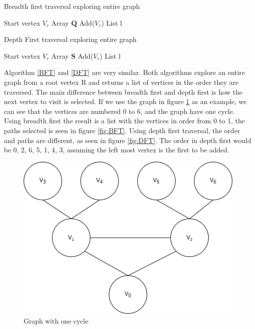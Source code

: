 \begin{algorithm}[H]
    \caption{Breadth first traversal exploring entire graph}
    \label{BFT}
    \SetAlgoLined
    Start vertex $V_r$\; Array $\mathbf{Q}$ Add($V_r$)\; List l\;
    \;
\end{algorithm}

\begin{algorithm}[H]
    \caption{Depth First traversal exploring entire graph}
    \label{DFT}
    \SetAlgoLined
    Start vertex $V_r$\; Array $\mathbf{S}$ Add($V_r$)\; List l\;
    \;
\end{algorithm}

Algorithm \ref{BFT} and \ref{DFT} are very similar. Both algorithms explore an entire graph from a root vertex R and returns a list of vertices in the order they are traversed. The main difference between breadth first and depth first is how the next vertex to visit is selected. If we use the graph in figure \ref{fig:graph} as an example, we can see that the vertices are numbered 0 to 6, and the graph have one cycle. Using breadth first the result is a list with the vertices in order from 0 to 1, the paths selected is seen in figure \ref{fig:BFT}. Using depth first traversal, the order and paths are different, as seen in figure \ref{fig:DFT}. The order in depth first would be 0, 2, 6, 5, 1, 4, 3, assuming the left most vertex is the first to be added.

\begin{figure}[h]
    \centering
    \includegraphics[scale=0.5]{figs/Graph.png}
    \caption{Graph with one cycle}
    \label{fig:graph}
\end{figure}

